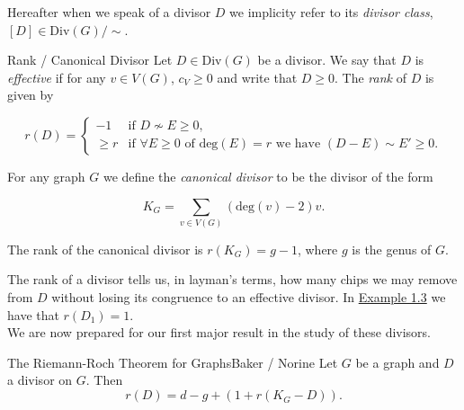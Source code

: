 \documentclass[10pt]{article}
\begin{document}
Hereafter when we speak of a divisor $D$ we implicity refer to its \emph{divisor class}, $[D]\in\text{Div}(G)/\sim$.

\begin{boxDef}{Rank / Canonical Divisor}
  Let $D\in\text{Div}(G)$ be a divisor. We say that $D$ is \emph{effective} if for any $v\in V(G)$, $c_V\geq0$ and write that $D\geq0$. The \emph{rank} of $D$ is given by

  \[r(D)=\begin{cases}-1 & \text{if }D\not\sim E\geq0, \\ \geq r & \text{if }\forall E\geq0 \text{ of } \text{deg}(E)=r\text{ we have }(D-E)\sim E'\geq0.\end{cases}\]

  For any graph $G$ we define the \emph{canonical divisor} to be the divisor of the form

  \[K_G=\sum_{v\in V(G)}(\text{deg}(v)-2)v.\]

  The rank of the canonical divisor is $r(K_G)=g-1$, where $g$ is the genus of $G$.
\end{boxDef}

The rank of a divisor tells us, in layman's terms, how many chips we may remove from $D$ without losing its congruence to an effective divisor. In \hyperlink{}{Example 1.3} we have that $r(D_1)=1$.\\

We are now prepared for our first major result in the study of these divisors.

\begin{boxThm}{The Riemann-Roch Theorem for Graphs\hfill Baker / Norine}
  Let $G$ be a graph and $D$ a divisor on $G$. Then
  \[r(D)=d-g+(1+r(K_G-D)).\]
\end{boxThm}
\end{document}
